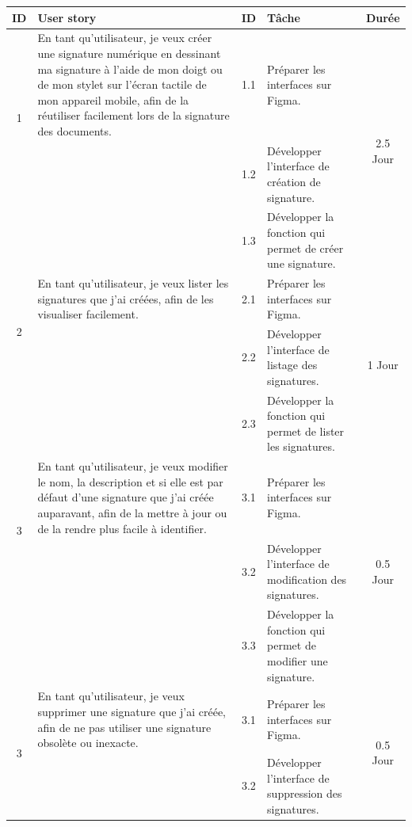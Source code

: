 \begin{adjustwidth}{-1cm}{}
    
    \begin{longtable}{|c|p{6cm}|c|p{6cm}|c|}
      \hline
      \textbf{ID} & \textbf{User story} & \textbf{ID}  & \textbf{Tâche} & \textbf{Durée} \\
      \hline
      \multirow{2}{*}{1} & En tant qu'utilisateur, je veux créer une signature numérique en dessinant ma signature à l'aide de mon doigt ou de mon stylet sur l'écran tactile de mon appareil mobile, afin de la réutiliser facilement lors de la signature des documents. & 1.1 & Préparer les interfaces sur Figma. & \multirow{3}{*}{2.5 Jour} \\
      \cline{3-4}
      & & 1.2 & Développer l'interface de création de signature. & \\
      \cline{3-4}
      & & 1.3 & Développer la fonction qui permet de créer une signature. & \\
      \cline{1-5}
      \multirow{2}{*}{2} & En tant qu'utilisateur, je veux lister les signatures que j'ai créées, afin de les visualiser facilement. & 2.1 & Préparer les interfaces sur Figma. & \multirow{3}{*}{1 Jour} \\
      \cline{3-4}
      & & 2.2 & Développer l'interface de listage des signatures. & \\
      \cline{3-4}
      & & 2.3 & Développer la fonction qui permet de lister les signatures. & \\
      \cline{1-5}
      \multirow{2}{*}{3} & En tant qu'utilisateur, je veux modifier le nom, la description et si elle est par défaut d'une signature que j'ai créée auparavant, afin de la mettre à jour ou de la rendre plus facile à identifier. & 3.1 & Préparer les interfaces sur Figma. & \multirow{3}{*}{0.5 Jour} \\
      \cline{3-4}
      & & 3.2 & Développer l'interface de modification des signatures. & \\
      \cline{3-4}
      & & 3.3 & Développer la fonction qui permet de modifier une signature. & \\
      \cline{1-5}
      \multirow{2}{*}{3} & En tant qu'utilisateur, je veux supprimer une signature que j'ai créée, afin de ne pas utiliser une signature
      obsolète ou inexacte. & 3.1 & Préparer les interfaces sur Figma. & \multirow{3}{*}{0.5 Jour} \\
      \cline{3-4}
      & & 3.2 & Développer l'interface de suppression des signatures. & \\

\end{longtable}
\end{adjustwidth}
